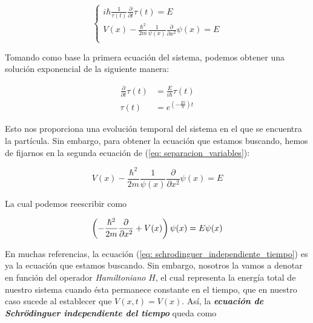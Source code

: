 \documentclass[12pt]{article}
\numberwithin{equation}{section} %
\begin{document}
    \begin{equation}
        \begin{cases}
            \displaystyle i \hbar \frac{1}{\tau(t)} \frac{\partial}{\partial t} \tau(t) = E \\[10pt]
            \displaystyle V(x) - \frac{\hbar^{2}}{2m} \frac{1}{\psi(x)} \frac{\partial}{\partial x^{2}} \psi(x) = E \\[10pt]
        \end{cases}
        \label{eq: separacion_variables}
    \end{equation}

    Tomando como base la primera ecuación del sistema, podemos obtener una solución exponencial de la siguiente manera:
        
    \begin{align*}
        \frac{\partial}{\partial t} \tau(t) &= \frac{E}{i \hbar} \tau(t) \\[10pt]
        \tau(t) &= e ^ { \left( - \frac{Ei}{\hbar} \right) t}
    \end{align*}

    Esto nos proporciona una evolución temporal del sistema en el que se encuentra la partícula. Sin embargo, para obtener la ecuación que estamos buscando, hemos de fijarnos en la segunda ecuación de (\ref{eq: separacion_variables}):

    \begin{equation*}
        V(x) - \frac{\hbar^{2}}{2m} \frac{1}{\psi(x)} \frac{\partial}{\partial x^{2}} \psi(x) = E
    \end{equation*}

    La cual podemos reescribir como

    \begin{equation}
        \left( - \frac{\hbar^{2}}{2m} \frac{\partial}{\partial x^{2}} + V(x) \right) \psi(x) = E \psi(x) \\[5pt]
        \label{eq: schrodinguer_independiente_tiempo}
    \end{equation}

    En muchas referencias, la ecuación (\ref{eq: schrodinguer_independiente_tiempo}) es ya la ecuación que estamos buscando. Sin embargo, nosotros la vamos a denotar en función del operador \textit{Hamiltoniano} \( H \), el cual representa la energía total de nuestro sistema cuando ésta permanece constante en el tiempo, que en nuestro caso sucede al establecer que \( V(x, t) = V(x) \). Así, la \textbf{\textit{ecuación de Schrödinguer independiente del tiempo}} queda como
    
\end{document}
